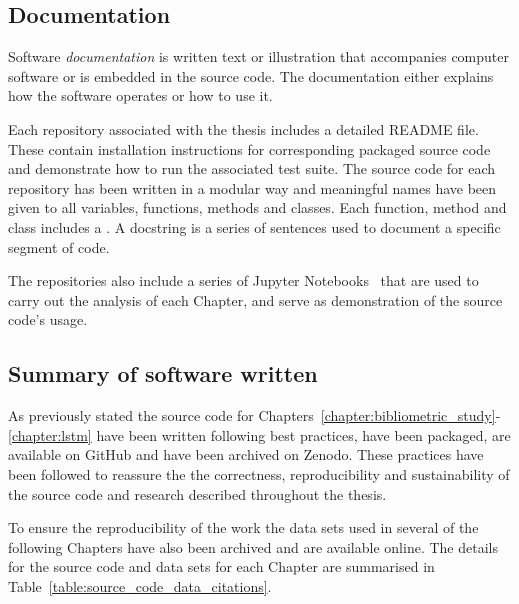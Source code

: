 \subsection{Documentation}

Software \textit{documentation} is written text or illustration that accompanies
computer software or is embedded in the source code. The documentation either
explains how the software operates or how to use it.

Each repository associated with the thesis includes a detailed README file.
These contain installation instructions for corresponding packaged source code
and demonstrate how to run the associated test suite. The source code for each
repository has been written in a modular way and meaningful names have been
given to all variables, functions, methods and classes. Each function, method
and class includes a . A docstring is a series of sentences used
to document a specific segment of code.

The repositories also include a series of Jupyter Notebooks~\cite{jupyter} that
are used to carry out the analysis of each Chapter, and serve as demonstration
of the source code's usage.

\subsection{Summary of software written}

As previously stated the source code for
Chapters~\ref{chapter:bibliometric_study}-\ref{chapter:lstm} have been written
following best practices, have been packaged, are available on GitHub and have
been archived on Zenodo. These practices have been followed to reassure the the
correctness, reproducibility and sustainability of the source code and research
described throughout the thesis.

To ensure the reproducibility of the work the data sets used in several of
the following Chapters have also been archived and are available online. The details
for the source code and data sets for each Chapter are summarised in
Table~\ref{table:source_code_data_citations}.

